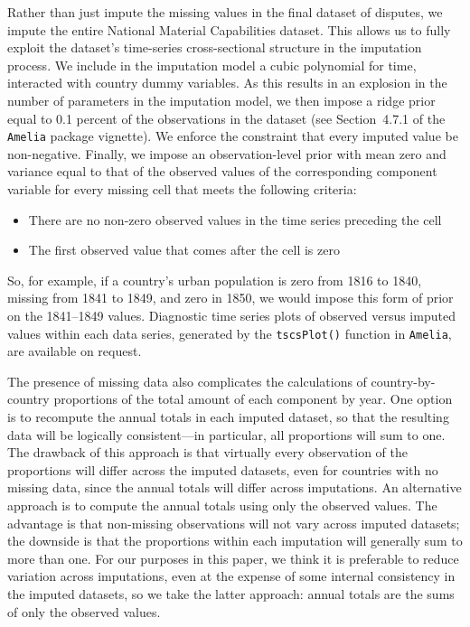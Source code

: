 Rather than just impute the missing values in the final dataset of disputes, we impute the entire National Material Capabilities dataset.
This allows us to fully exploit the dataset's time-series cross-sectional structure in the imputation process.
We include in the imputation model a cubic polynomial for time, interacted with country dummy variables.
As this results in an explosion in the number of parameters in the imputation model, we then impose a ridge prior equal to 0.1 percent of the observations in the dataset (see Section~4.7.1 of the \texttt{Amelia} package vignette).
We enforce the constraint that every imputed value be non-negative.
Finally, we impose an observation-level prior with mean zero and variance equal to that of the observed values of the corresponding component variable for every missing cell that meets the following criteria:
\begin{itemize}
  \item There are no non-zero observed values in the time series preceding the cell
  \item The first observed value that comes after the cell is zero
\end{itemize}
So, for example, if a country's urban population is zero from 1816 to 1840, missing from 1841 to 1849, and zero in 1850, we would impose this form of prior on the 1841--1849 values.
Diagnostic time series plots of observed versus imputed values within each data series, generated by the \texttt{tscsPlot()} function in \texttt{Amelia}, are available on request.

The presence of missing data also complicates the calculations of country-by-country proportions of the total amount of each component by year.
One option is to recompute the annual totals in each imputed dataset, so that the resulting data will be logically consistent---in particular, all proportions will sum to one.
The drawback of this approach is that virtually every observation of the proportions will differ across the imputed datasets, even for countries with no missing data, since the annual totals will differ across imputations.
An alternative approach is to compute the annual totals using only the observed values.
The advantage is that non-missing observations will not vary across imputed datasets; the downside is that the proportions within each imputation will generally sum to more than one.
For our purposes in this paper, we think it is preferable to reduce variation across imputations, even at the expense of some internal consistency in the imputed datasets, so we take the latter approach: annual totals are the sums of only the observed values.

